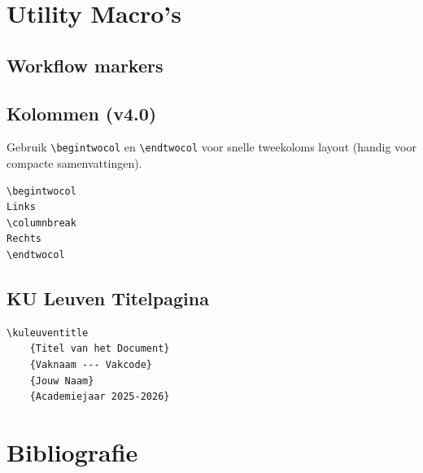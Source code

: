 \documentclass[a4paper,11pt]{article}
\begin{document}
\section{Utility Macro's}

\subsection{Workflow markers}

 \quad {} \quad {}

\subsection{Kolommen (v4.0)}
Gebruik \verb|\begintwocol| en \verb|\endtwocol| voor snelle tweekoloms layout (handig voor compacte samenvattingen).

\begin{verbatim}
\begintwocol
Links
\columnbreak
Rechts
\endtwocol
\end{verbatim}

\subsection{KU Leuven Titelpagina}

\begin{verbatim}
\kuleuventitle
    {Titel van het Document}
    {Vaknaam --- Vakcode}
    {Jouw Naam}
    {Academiejaar 2025-2026}
\end{verbatim}

\newpage
\appendix

\printsymbols
\printformularium

\section*{Bibliografie}
\printbibliography[heading=none]
\end{document}
